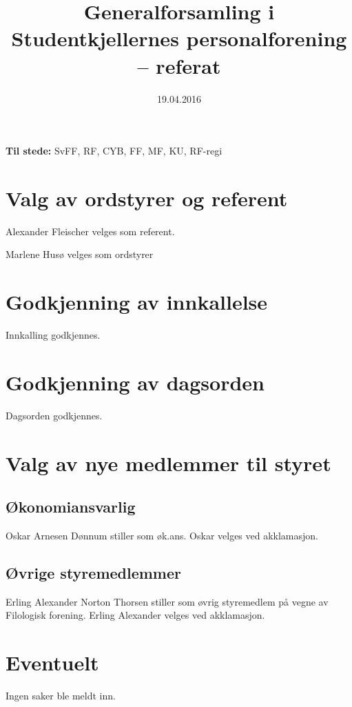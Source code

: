 \documentclass{article}[12pt]
\begin{document}
\title{Generalforsamling i Studentkjellernes personalforening -- referat}
\date{19.04.2016}
\maketitle

\textbf{Til stede:} SvFF, RF, CYB, FF, MF, KU, RF-regi

\section{Valg av ordstyrer og referent}

Alexander Fleischer velges som referent.

Marlene Husø velges som ordstyrer

\section{Godkjenning av innkallelse}

Innkalling godkjennes.

\section{Godkjenning av dagsorden}

Dagsorden godkjennes.

\section{Valg av nye medlemmer til styret}
\subsection{Økonomiansvarlig}
Oskar Arnesen Dønnum stiller som øk.ans.
Oskar velges ved akklamasjon.

\subsection{Øvrige styremedlemmer}
Erling Alexander Norton Thorsen stiller som øvrig styremedlem på vegne
av Filologisk forening. Erling Alexander velges ved akklamasjon.

\section{Eventuelt}
Ingen saker ble meldt inn.
\end{document}
